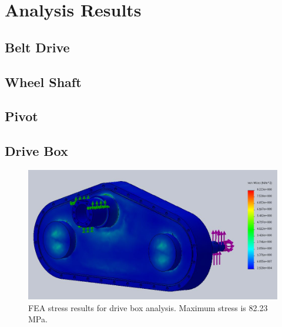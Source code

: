 \section{Analysis Results}

\subsection{Belt Drive}\label{bd_fea}


\subsection{Wheel Shaft}\label{ws_fea}


\subsection{Pivot}\label{pivot_fea}


\subsection{Drive Box}\label{box_fea}

\begin{figure}[htbp]
\centering
\includegraphics[width=\textwidth]{images/drive_box_stress_fea}
\caption[Drive Box FEA Stress Results]{FEA stress results for drive box analysis. Maximum stress is 82.23 MPa.}
\label{fig:box_fea1}
\end{figure}

